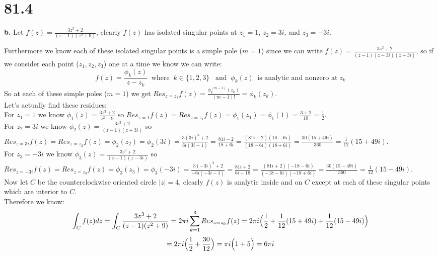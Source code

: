 \documentclass{article}
\begin{document}
\newpage
\section*{81.4}

{\Large\textbf{b.}} Let $f(z) =\frac{3z^3 + 2}{(z - 1)(z^2 + 9)}$, clearly $f(z)$ has isolated singular points at $z_1 = 1$, $z_2 = 3i$, and $z_3 = -3i$.
\begin{center}
    \doublespacing
    Furthermore we know each of these isolated singular points is a simple pole ($m=1$) since we can write $f(z) =\frac{3z^3 + 2}{(z - 1)(z - 3i)(z + 3i)}$, so if we consider each point ($z_1, z_2, z_3$) one at a time we know we can write:
    \[f(z) =\frac{\phi _k (z)}{z - z_k}\;\;\text{where}\;\;k\in\{1, 2, 3\}\;\;\;\text{and}\;\;\phi _k (z)\;\;\text{is analytic and nonzero at}\;z_k\]
    So at each of these simple poles ($m=1$) we get $Res _{z=z_k} f(z) =\frac{\phi _k^{(m-1)} (z_k)}{(m-1)!} =\phi _k (z_k)$.
    \\Let's actually find these residues:
    \\For $z_1 = 1$ we know $\phi _1 (z) =\frac{3z^3 + 2}{z^2 + 9}$ so $Res _{z=1} f(z) = Res _{z=z_1} f(z) =\phi _1 (z_1) =\phi _1 (1) =\frac{3 + 2}{10} =\frac{1}{2}$.
    \\For $z_2 = 3i$ we know $\phi _2 (z) =\frac{3z^3 + 2}{(z-1)(z+3i)}$ so $Res _{z=3i} f(z) = Res _{z=z_2} f(z) =\phi _2 (z_2) =\phi _2 (3i) =\frac{3(3i)^3 + 2}{6i(3i-1)} =\frac{81i - 2}{18 + 6i} =\frac{(81i - 2)(18 - 6i)}{(18 - 6i)(18 + 6i)} =\frac{30(15+49i)}{360} =\frac{1}{12}(15 + 49i)$.
    \\For $z_3 = -3i$ we know $\phi _3 (z) =\frac{3z^3 + 2}{(z-1)(z-3i)}$ so $Res _{z=-3i} f(z) = Res _{z=z_3} f(z) =\phi _3 (z_3) =\phi _3 (-3i) =\frac{3(-3i)^3 + 2}{-6i(-3i-1)} =\frac{81i + 2}{6i-18} =\frac{(81i + 2)(-18 - 6i)}{(-18 - 6i)(-18 + 6i)} =\frac{30(15-49i)}{360} =\frac{1}{12}(15-49i)$.
    \break
    \\Now let $C$ be the counterclockwise oriented circle $|z| = 4$, clearly $f(z)$ is analytic inside and on $C$ except at each of these singular points which are interior to $C$.
    \\Therefore we know:
    \[\int _C f(z) dz =\int _C\frac{3z^3 + 2}{(z - 1)(z^2 + 9)} = 2\pi i\sum _{k=1}^3 Res_{z=z_k} f(z) = 2\pi i\Big{(}\frac{1}{2} +\frac{1}{12}(15 + 49i) +\frac{1}{12}(15 - 49i)\Big{)}\]
    \[= 2\pi i\Big{(}\frac{1}{2} +\frac{30}{12}\Big{)} =\pi i\Big{(}1 + 5\Big{)} = 6\pi i\]
    \qedsymbol
\end{center}
\end{document}
